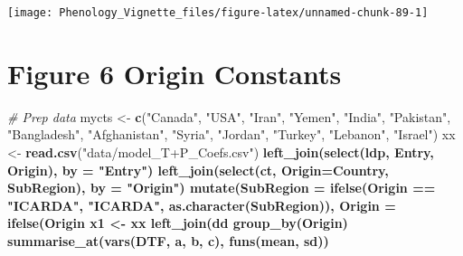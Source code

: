 \documentclass[
]{article}
\newenvironment{Shaded}{\begin{snugshade}}{\end{snugshade}}
\newcommand{\CommentTok}[1]{\textcolor[rgb]{0.56,0.35,0.01}{\textit{#1}}}
\newcommand{\DataTypeTok}[1]{\textcolor[rgb]{0.13,0.29,0.53}{#1}}
\newcommand{\KeywordTok}[1]{\textcolor[rgb]{0.13,0.29,0.53}{\textbf{#1}}}
\newcommand{\NormalTok}[1]{#1}
\newcommand{\OperatorTok}[1]{\textcolor[rgb]{0.81,0.36,0.00}{\textbf{#1}}}
\newcommand{\StringTok}[1]{\textcolor[rgb]{0.31,0.60,0.02}{#1}}
\begin{document}
\texttt{[image: Phenology\_Vignette\_files/figure-latex/unnamed-chunk-89-1]}

\hypertarget{figure-6-origin-constants}{%
\section{Figure 6 Origin Constants}\label{figure-6-origin-constants}}

\begin{Shaded}
\begin{Highlighting}[]
\CommentTok{# Prep data}
\NormalTok{mycts <-}\StringTok{ }\KeywordTok{c}\NormalTok{(}\StringTok{"Canada"}\NormalTok{, }\StringTok{"USA"}\NormalTok{, }\StringTok{"Iran"}\NormalTok{, }\StringTok{"Yemen"}\NormalTok{,}
           \StringTok{"India"}\NormalTok{, }\StringTok{"Pakistan"}\NormalTok{, }\StringTok{"Bangladesh"}\NormalTok{, }\StringTok{"Afghanistan"}\NormalTok{,}
           \StringTok{"Syria"}\NormalTok{, }\StringTok{"Jordan"}\NormalTok{, }\StringTok{"Turkey"}\NormalTok{, }\StringTok{"Lebanon"}\NormalTok{, }\StringTok{"Israel"}\NormalTok{)}
\NormalTok{xx <-}\StringTok{ }\KeywordTok{read.csv}\NormalTok{(}\StringTok{"data/model_T+P_Coefs.csv"}\NormalTok{) }\OperatorTok{%
\StringTok{  }\KeywordTok{left_join}\NormalTok{(}\KeywordTok{select}\NormalTok{(ldp, Entry, Origin), }\DataTypeTok{by =} \StringTok{"Entry"}\NormalTok{) }\OperatorTok{%
\StringTok{  }\KeywordTok{left_join}\NormalTok{(}\KeywordTok{select}\NormalTok{(ct, }\DataTypeTok{Origin=}\NormalTok{Country, SubRegion), }\DataTypeTok{by =} \StringTok{"Origin"}\NormalTok{) }\OperatorTok{%
\StringTok{  }\KeywordTok{mutate}\NormalTok{(}\DataTypeTok{SubRegion =} \KeywordTok{ifelse}\NormalTok{(Origin }\OperatorTok{==}\StringTok{ "ICARDA"}\NormalTok{, }\StringTok{"ICARDA"}\NormalTok{, }\KeywordTok{as.character}\NormalTok{(SubRegion)),}
         \DataTypeTok{Origin =} \KeywordTok{ifelse}\NormalTok{(Origin }\OperatorTok{%
\NormalTok{x1 <-}\StringTok{ }\NormalTok{xx }\OperatorTok{%
\StringTok{  }\KeywordTok{left_join}\NormalTok{(dd }\OperatorTok{%
\StringTok{  }\KeywordTok{group_by}\NormalTok{(Origin) }\OperatorTok{%
\StringTok{  }\KeywordTok{summarise_at}\NormalTok{(}\KeywordTok{vars}\NormalTok{(DTF, a, b, c), }\KeywordTok{funs}\NormalTok{(mean, sd)) }\OperatorTok{%
}}}}}}}}
\end{Highlighting}
\end{Shaded}
\end{document}
